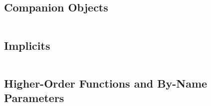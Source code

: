 \begin{lstlisting}[language=Scala]
\end{lstlisting}

\subsection{Companion Objects}

\begin{lstlisting}[language=Scala]
\end{lstlisting}

\subsection{Implicits}

\begin{lstlisting}[language=Scala]
\end{lstlisting}

\subsection{Higher-Order Functions and By-Name Parameters}

\begin{lstlisting}[language=Scala]
\end{lstlisting}
